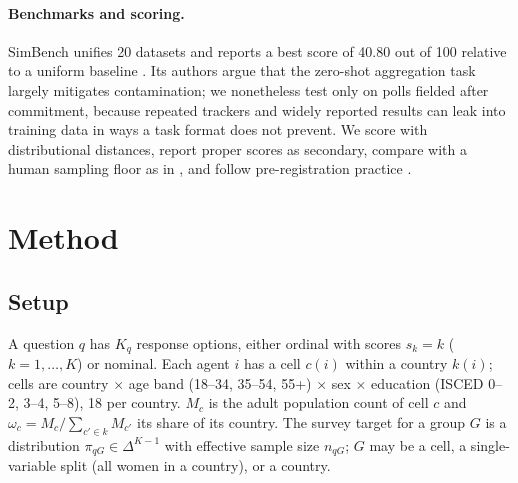 \documentclass[11pt]{article}
\begin{document}
\paragraph{Benchmarks and scoring.}
SimBench unifies 20 datasets and reports a best score of 40.80 out of 100 relative to a uniform baseline \citep{hu2025simbench}. Its authors argue that the zero-shot aggregation task largely mitigates contamination; we nonetheless test only on polls fielded after commitment, because repeated trackers and widely reported results can leak into training data in ways a task format does not prevent. We score with distributional distances, report proper scores \citep{brier1950,epstein1969rps,gneiting2007scoring} as secondary, compare with a human sampling floor as in \citet{suh2025subpop}, and follow pre-registration practice \citep{nosek2018prereg}.

\section{Method}
\label{sec:method}

\subsection{Setup}
A question $q$ has $K_q$ response options, either ordinal with scores $s_k=k$ ($k=1,\dots,K$) or nominal. Each agent $i$ has a cell $c(i)$ within a country $k(i)$; cells are country $\times$ age band (18--34, 35--54, 55+) $\times$ sex $\times$ education (ISCED 0--2, 3--4, 5--8), 18 per country. $M_c$ is the adult population count of cell $c$ and $\omega_c = M_c/\sum_{c'\in k} M_{c'}$ its share of its country. The survey target for a group $G$ is a distribution $\pi_{qG}\in\Delta^{K-1}$ with effective sample size $n_{qG}$; $G$ may be a cell, a single-variable split (all women in a country), or a country.
\end{document}
